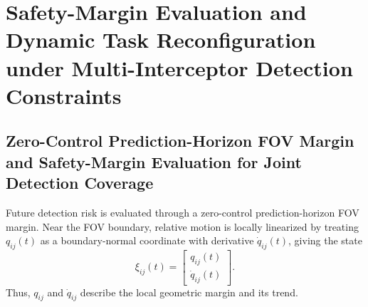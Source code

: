 \documentclass{cja}
\begin{document}
\section{Safety-Margin Evaluation and Dynamic Task Reconfiguration under Multi-Interceptor Detection Constraints}

\subsection{Zero-Control Prediction-Horizon FOV Margin and Safety-Margin Evaluation for Joint Detection Coverage}

Future detection risk is evaluated through a zero-control prediction-horizon FOV margin. Near the FOV boundary, relative motion is locally linearized by treating $q_{ij}(t)$ as a boundary-normal coordinate with derivative $\dot q_{ij}(t)$, giving the state
\begin{equation}
\xi_{ij}(t)=
\begin{bmatrix}
q_{ij}(t)\\
\dot q_{ij}(t)
\end{bmatrix}.
\end{equation}
Thus, $q_{ij}$ and $\dot q_{ij}$ describe the local geometric margin and its trend.
\end{document}
